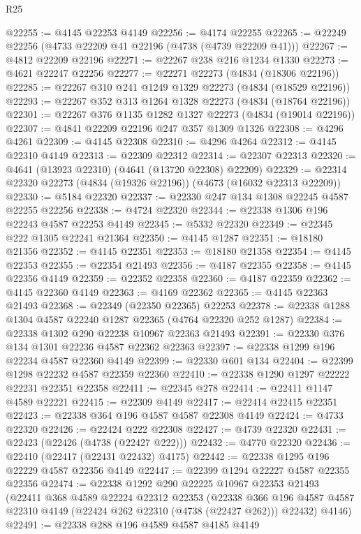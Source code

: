 \begin{lexlean}{R25}
\begin{coremodule}
@22255 := @4145 @22253 @4149
@22256 := @4174 @22255
@22265 := @22249 @22256 (@4733 @22209 @41 @22196 (@4738 (@4739 @22209 @41)))
@22267 := @4812 @22209 @22196
@22271 := @22267 @238 @216 @1234 @1330
@22273 := @4621 @22247 @22256
@22277 := @22271 @22273 (@4834 (@18306 @22196))
@22285 := @22267 @310 @241 @1249 @1329 @22273 (@4834 (@18529 @22196))
@22293 := @22267 @352 @313 @1264 @1328 @22273 (@4834 (@18764 @22196))
@22301 := @22267 @376 @1135 @1282 @1327 @22273 (@4834 (@19014 @22196))
@22307 := @4841 @22209 @22196 @247 @357 @1309 @1326
@22308 := @4296 @4261
@22309 := @4145 @22308
@22310 := @4296 @4264
@22312 := @4145 @22310 @4149
@22313 := @22309 @22312
@22314 := @22307 @22313
@22320 := @4641 (@13923 @22310) (@4641 (@13720 @22308) @22209)
@22329 := @22314 @22320 @22273 (@4834 (@19326 @22196)) (@4673 (@16032 @22313 @22209))
@22330 := @5184 @22320
@22337 := @22330 @247 @134 @1308 @22245 @4587 @22255 @22256
@22338 := @4724 @22320
@22344 := @22338 @1306 @196 @22243 @4587 @22253 @4149
@22345 := @5332 @22320
@22349 := @22345 @222 @1305 @22241 @21364
@22350 := @4145 @1287
@22351 := @18180 @21356
@22352 := @4145 @22351
@22353 := @18180 @21358
@22354 := @4145 @22353
@22355 := @22354 @21493
@22356 := @4187 @22355
@22358 := @4145 @22356 @4149
@22359 := @22352 @22358
@22360 := @4187 @22359
@22362 := @4145 @22360 @4149
@22363 := @4169 @22362
@22365 := @4145 @22363 @21493
@22368 := @22349 (@22350 @22365) @22253
@22378 := @22338 @1288 @1304 @4587 @22240 @1287 @22365 (@4764 @22320 @252 @1287)
@22384 := @22338 @1302 @290 @22238 @10967 @22363 @21493
@22391 := @22330 @376 @134 @1301 @22236 @4587 @22362 @22363
@22397 := @22338 @1299 @196 @22234 @4587 @22360 @4149
@22399 := @22330 @601 @134
@22404 := @22399 @1298 @22232 @4587 @22359 @22360
@22410 := @22338 @1290 @1297 @22222 @22231 @22351 @22358
@22411 := @22345 @278
@22414 := @22411 @1147 @4589 @22221
@22415 := @22309 @4149
@22417 := @22414 @22415 @22351
@22423 := @22338 @364 @196 @4587 @4587 @22308 @4149
@22424 := @4733 @22320
@22426 := @22424 @222 @22308
@22427 := @4739 @22320
@22431 := @22423 (@22426 (@4738 (@22427 @222)))
@22432 := @4770 @22320
@22436 := @22410 (@22417 (@22431 @22432) @4175)
@22442 := @22338 @1295 @196 @22229 @4587 @22356 @4149
@22447 := @22399 @1294 @22227 @4587 @22355 @22356
@22474 := @22338
    @1292
    @290
    @22225
    @10967
    @22353
    @21493
    (@22411
      @368
      @4589
      @22224
      @22312
      @22353
      (@22338 @366 @196 @4587 @4587 @22310 @4149 (@22424 @262 @22310 (@4738 (@22427 @262))) @22432)
      @4146)
@22491 := @22338
    @288
    @196
    @4589
    @4587
    @4185
    @4149

\end{coremodule}
\end{lexlean}
